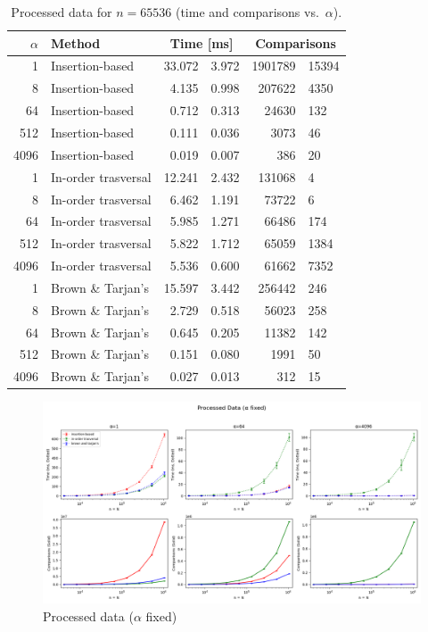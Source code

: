 \documentclass[12pt]{article}
\begin{document}
\begin{table}[H]
\centering
\caption{Processed data for $n=65536$ (time and comparisons vs.\ $\alpha$).}
\begin{tabular}{r l r@{\,$\pm$\,}l r@{\,$\pm$\,}l}
\hline
$\alpha$ & Method &
\multicolumn{2}{c}{Time [ms]} &
\multicolumn{2}{c}{Comparisons} \\
\hline
1    & Insertion-based     & 33.072 & 3.972 &1901789 &15394 \\
8    & Insertion-based     &  4.135 & 0.998 & 207622 & 4350 \\
64   & Insertion-based     &  0.712 & 0.313 &  24630 & 132  \\
512  & Insertion-based     &  0.111 & 0.036 &   3073 & 46   \\
4096 & Insertion-based     &  0.019 & 0.007 &    386 & 20   \\[2pt]
1    & In-order trasversal & 12.241 & 2.432 & 131068 & 4    \\
8    & In-order trasversal &  6.462 & 1.191 &  73722 & 6    \\
64   & In-order trasversal &  5.985 & 1.271 &  66486 & 174  \\
512  & In-order trasversal &  5.822 & 1.712 &  65059 & 1384 \\
4096 & In-order trasversal &  5.536 & 0.600 &  61662 & 7352 \\[2pt]
1    & Brown \& Tarjan's   & 15.597 & 3.442 & 256442 & 246  \\
8    & Brown \& Tarjan's   &  2.729 & 0.518 &  56023 & 258  \\
64   & Brown \& Tarjan's   &  0.645 & 0.205 &  11382 & 142  \\
512  & Brown \& Tarjan's   &  0.151 & 0.080 &   1991 & 50   \\
4096 & Brown \& Tarjan's   &  0.027 & 0.013 &    312 & 15   \\
\hline
\end{tabular}
\label{tab:processed-n65536}
\end{table}


\begin{figure}
    \centering
    \includegraphics[width=\textwidth]{figure/Processed1.png}
    \caption{Processed data ($\alpha$ fixed)}
    \label{fig.proc1}
\end{figure}
\end{document}
